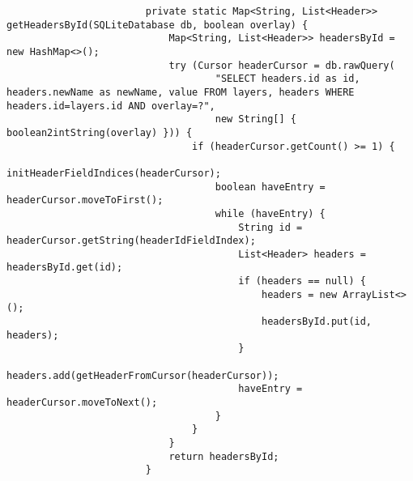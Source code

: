 \begin{enumerate}
\begin{itemize}
\begin{verbatim}
                        private static Map<String, List<Header>> getHeadersById(SQLiteDatabase db, boolean overlay) {
                            Map<String, List<Header>> headersById = new HashMap<>();
                            try (Cursor headerCursor = db.rawQuery(
                                    "SELECT headers.id as id, headers.newName as newName, value FROM layers, headers WHERE headers.id=layers.id AND overlay=?",
                                    new String[] { boolean2intString(overlay) })) {
                                if (headerCursor.getCount() >= 1) {
                                    initHeaderFieldIndices(headerCursor);
                                    boolean haveEntry = headerCursor.moveToFirst();
                                    while (haveEntry) {
                                        String id = headerCursor.getString(headerIdFieldIndex);
                                        List<Header> headers = headersById.get(id);
                                        if (headers == null) {
                                            headers = new ArrayList<>();
                                            headersById.put(id, headers);
                                        }
                                        headers.add(getHeaderFromCursor(headerCursor));
                                        haveEntry = headerCursor.moveToNext();
                                    }
                                }
                            }
                            return headersById;
                        }
                    \end{verbatim}
          \end{itemize}
\end{enumerate}